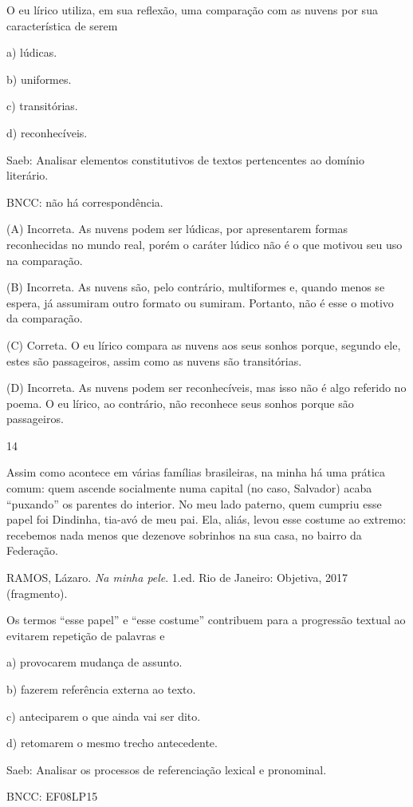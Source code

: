 O eu lírico utiliza, em sua reflexão, uma comparação com as nuvens por
sua característica de serem

a) lúdicas.

b) uniformes.

c) transitórias.

d) reconhecíveis.

Saeb: Analisar elementos constitutivos de textos pertencentes ao domínio
literário.

BNCC: não há correspondência.

(A) Incorreta. As nuvens podem ser lúdicas, por apresentarem formas
reconhecidas no mundo real, porém o caráter lúdico não é o que motivou
seu uso na comparação.

(B) Incorreta. As nuvens são, pelo contrário, multiformes e, quando
menos se espera, já assumiram outro formato ou sumiram. Portanto, não é
esse o motivo da comparação.

(C) Correta. O eu lírico compara as nuvens aos seus sonhos porque,
segundo ele, estes são passageiros, assim como as nuvens são
transitórias.

(D) Incorreta. As nuvens podem ser reconhecíveis, mas isso não é algo
referido no poema. O eu lírico, ao contrário, não reconhece seus sonhos
porque são passageiros.

\num{14}

Assim como acontece em várias famílias brasileiras, na minha há uma
prática comum: quem ascende socialmente numa capital (no caso, Salvador)
acaba ``puxando'' os parentes do interior. No meu lado paterno, quem
cumpriu esse papel foi Dindinha, tia-avó de meu pai. Ela, aliás, levou
esse costume ao extremo: recebemos nada menos que dezenove sobrinhos na
sua casa, no bairro da Federação.

RAMOS, Lázaro. \emph{Na minha pele}. 1.ed. Rio de Janeiro: Objetiva,
2017 (fragmento).

Os termos ``esse papel'' e ``esse costume'' contribuem para a progressão
textual ao evitarem repetição de palavras e

a) provocarem mudança de assunto.

b) fazerem referência externa ao texto.

c) anteciparem o que ainda vai ser dito.

d) retomarem o mesmo trecho antecedente.

Saeb: Analisar os processos de referenciação lexical e pronominal.

BNCC: EF08LP15

